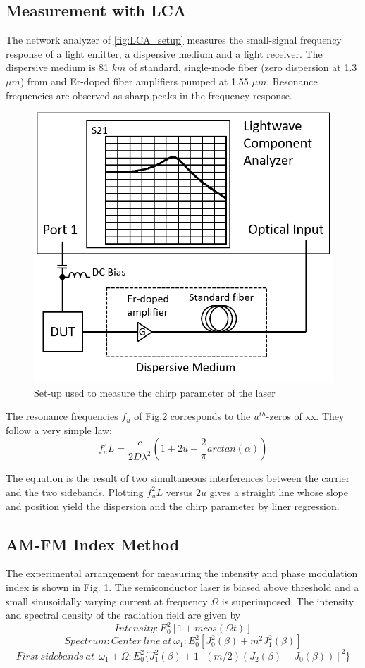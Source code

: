 \subsection{Measurement with LCA}\label{subsec:measurement_with_LCA}
The network analyzer of \autoref{fig:LCA_setup} measures the small-signal frequency response of a light emitter, a dispersive medium and a light receiver. The dispersive medium is 81 $km$ of standard, single-mode fiber (zero dispersion at 1.3 $\mu m$) from and Er-doped fiber amplifiers pumped at 1.55 $\mu m$. Resonance frequencies are observed as sharp peaks in the frequency response.
\begin{figure}[ht]
    \centering
    \includegraphics[width=.5\linewidth]{figures/LCA_setup.png}
    \caption{Set-up used to measure the chirp parameter of the laser}
    \label{fig:LCA_setup}
\end{figure}

The resonance frequencies $f_u$ of Fig.2 corresponds to the $u^{th}$-zeros of xx. They follow a very simple law:
\begin{equation}
    f_u^2L=\frac{c}{2D\lambda ^2}(1+2u-\frac{2}{\pi}arctan(\alpha))
    \label{eq:LCA_equa}
\end{equation}

The equation is the result of two simultaneous interferences between the carrier and the two sidebands. Plotting $f_u^2L$ versus $2u$ gives a straight line whose slope and position yield the dispersion and the chirp parameter by liner regression.

\subsection{AM-FM Index Method}
The experimental arrangement for measuring the intensity and phase modulation index is shown in Fig. 1. The semiconductor laser is biased above threshold and a small sinusoidally varying current at frequency $\Omega$ is superimposed. The intensity and spectral density of the radiation field are given by
\begin{equation}
    Intensity: E_0^2[1+mcos(\Omega t)]
\end{equation}
\begin{equation}
    Spectrum: Center \ line \ at \ \omega_1: E_0^2[J_0^2(\beta)+m^2J_1^2(\beta)]
    \label{eq:alpha_2}
\end{equation}
\begin{equation}
    First \ sidebands \ at \
    \ \omega_1 \pm \Omega: E_0^2\big\{J_1^2(\beta)+1[(m/2)(J_2(\beta)-J_0(\beta))]^2\big\}
    \label{eq:alpha_3}
\end{equation}

